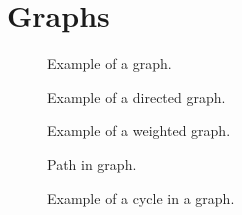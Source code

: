 \section{Graphs}

\begin{figure}[tbp]
  
  \caption{Example of a graph.}
  \label{fig:bs:graphs:graph}
\end{figure}

\begin{figure}[tbp]
  
  \caption{Example of a directed graph.}
  \label{fig:bs:graphs:directed}
\end{figure}

\begin{figure}[tbp]
  
  \caption{Example of a weighted graph.}
  \label{fig:bs:graphs:weighted}
\end{figure}

\begin{figure}[tbp]
  
  \caption{Path in graph.}
  \label{fig:bs:graphs:weighted}
\end{figure}

\begin{figure}[tbp]
  
  \caption{Example of a cycle in a graph.}
  \label{fig:bs:graphs:cycle}
\end{figure}

